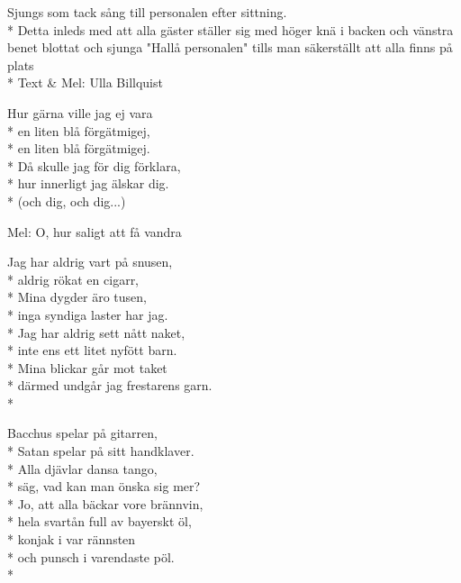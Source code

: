 \pagestyle{Bordsvisor}
\begin{SongText}
    \begin{SongInfo}
        Sjungs som tack sång till personalen efter sittning.\\*%
        Detta inleds med att alla gäster ställer sig med höger knä i backen och vänstra benet blottat och sjunga "Hallå personalen" tills man säkerställt att alla finns på plats\\*%
        Text \& Mel: Ulla Billquist
    \end{SongInfo}
    \begin{SongVerse}
        Hur gärna ville jag ej vara\\*%
        en liten blå förgätmigej,\\*%
        en liten blå förgätmigej.\\*%
        Då skulle jag för dig förklara,\\*%
        hur innerligt jag älskar dig.\\*%
        (och dig, och dig...)
    \end{SongVerse}
\end{SongText}
\begin{SongText}
    \begin{SongInfo}
        Mel: O, hur saligt att få vandra
    \end{SongInfo}
    \begin{SongVerse}
        Jag har aldrig vart på snusen,\\*%
        aldrig rökat en cigarr,\\*%
        Mina dygder äro tusen,\\*%
        inga syndiga laster har jag.\\*%
        Jag har aldrig sett nått naket,\\*%
        inte ens ett litet nyfött barn.\\*%
        Mina blickar går mot taket\\*%
        därmed undgår jag frestarens garn.\\*%
    \end{SongVerse}
    \begin{SongVerse}
        Bacchus spelar på gitarren,\\*%
        Satan spelar på sitt handklaver.\\*%
        Alla djävlar dansa tango,\\*%
        säg, vad kan man önska sig mer?\\*%
        Jo, att alla bäckar vore brännvin,\\*%
        hela svartån full av bayerskt öl,\\*%
        konjak i var rännsten\\*%
        och punsch i varendaste pöl.\\*%
    \end{SongVerse}
\end{SongText}
